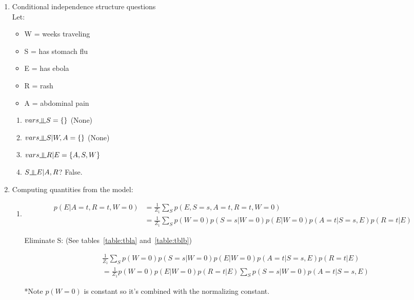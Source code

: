 \documentclass{article}
\newcommand{\indep}{\rotatebox[origin=c]{90}{$\models$}}
\begin{document}
\begin{enumerate}[label=(\alph*)]
\setlength\itemsep{1em}

\item Conditional independence structure questions \\
Let:
\begin{itemize}
\item W = weeks traveling
\item S = has stomach flu
\item E = has ebola
\item R = rash
\item A = abdominal pain

\end{itemize}

\begin{enumerate}[label=\roman*.]

\item $vars \indep S = \{\}$  (None)

\item $vars \indep S | W,A = \{\}$ (None)

\item $vars \indep R | E = \{A,S,W\}$

\item $S \indep E | A,R$? False.

\end{enumerate}

\item Computing quantities from the model: 

\begin{enumerate}[label=\roman*.]

\item 
\begin{align*}
p(E|A=t,R=t,W=0) &= \frac{1}{Z_1}\sum_S p(E,S=s,A=t,R=t,W=0) \\
&= \frac{1}{Z_1}\sum_S p(W=0)p(S=s|W=0)p(E|W=0)p(A=t|S=s,E)p(R=t|E)
\end{align*}

Eliminate S: (See tables~\ref{table:tbla} and~\ref{table:tblb})
 
\begin{align*}
&\frac{1}{Z_1}\sum_S p(W=0)p(S=s|W=0)p(E|W=0)p(A=t|S=s,E)p(R=t|E) \\
&= \frac{1}{Z_1}p(W=0)p(E|W=0)p(R=t|E)\sum_S p(S=s|W=0)p(A=t|S=s,E)
\end{align*}

*Note $p(W=0)$ is constant so it's combined with the normalizing constant.


\end{enumerate}
\end{enumerate}
\end{document}
